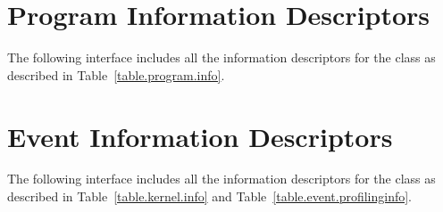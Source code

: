 \section{Program Information Descriptors}
\label{appendix.program.descriptors}
The following interface includes all the information descriptors
for the  class as described in Table~\ref{table.program.info}.


\section{Event Information Descriptors}
\label{appendix.event.descriptors}
The following interface includes all the information descriptors
for the  class as described in Table~\ref{table.kernel.info}
and Table~\ref{table.event.profilinginfo}.
